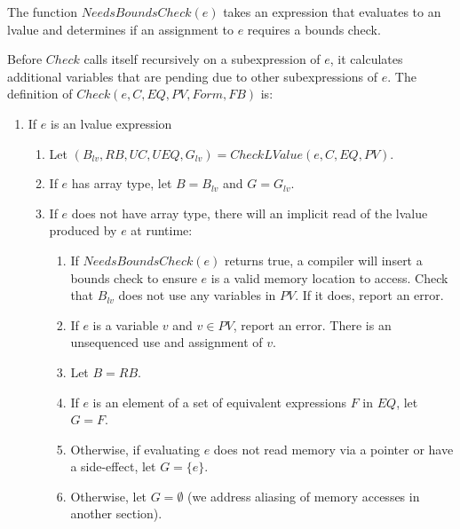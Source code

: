 The function $NeedsBoundsCheck(e)$ takes
an expression that evaluates to an lvalue and determines if an 
assignment to $e$ requires a bounds check.

Before $Check$ calls itself recursively on a subexpression of $e$, it calculates 
additional variables that are pending due to other subexpressions of $e$.
The definition of $Check(e, C, EQ, PV, Form, FB)$ is:
\begin{enumerate}
\item If $e$ is an lvalue expression
\begin{enumerate}
\item Let $(B_{lv}, RB, \mathit{UC}, UEQ, G_{lv}) = CheckLValue(e, C, EQ,PV)$.
\item If $e$ has array type, let $B = B_{lv}$ and $G = G_{lv}$.
\item If $e$ does not have array type, there will an implicit read of the lvalue produced by $e$
at runtime:
\begin{enumerate}
\item If $NeedsBoundsCheck(e)$ returns true, a compiler will insert a bounds check 
to ensure $e$ is a valid memory location to access.  Check that $B_{lv}$ does not use any variables in 
$PV$.  If it does, report an error.
\item If $e$ is a variable $v$ and $v \in PV$, report an error.  There is an unsequenced use and
assignment of $v$.
\item Let $B = RB$. 
\item If $e$ is an element of a set of equivalent expressions $F$ in $EQ$, let $G = F$.
\item Otherwise, if evaluating $e$ does not read memory via a pointer or have a side-effect, let $G = \{ e \}$.
\item Otherwise, let $G = \emptyset$ (we address aliasing of memory accesses in another section).
\end{enumerate}
\end{enumerate}



\end{enumerate}
